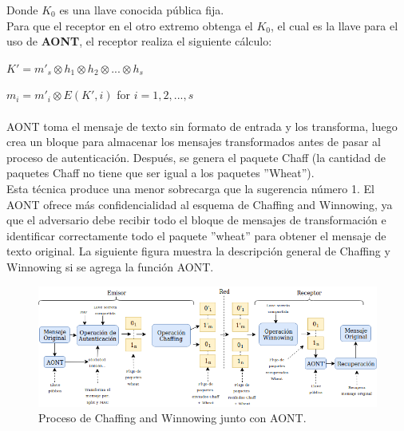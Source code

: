 \documentclass[12pt, a4paper, titlepage]{article}
\begin{document}
        Donde $K_0$ es una llave conocida pública fija.\\
        Para que el receptor en el otro extremo obtenga el $K_0$, el cual es la llave para el uso de \textbf{AONT}, el receptor realiza el siguiente cálculo:
        
        \begin{center}
            $K'=m'_s \otimes h_1 \otimes h_2 \otimes ... \otimes h_s$
        \end{center}
        \begin{center}
            $m_i=m'_i \otimes E(K',i)$ for $i=1,2,...,s$
        \end{center}
        
        \paragraph{}
        AONT toma el mensaje de texto sin formato de entrada y los transforma, luego crea un bloque para almacenar los mensajes transformados antes de pasar al proceso de autenticación. Después, se genera el paquete Chaff (la cantidad de paquetes Chaff no tiene que ser igual a los paquetes ''Wheat'').\\
        Esta técnica produce una menor sobrecarga que la sugerencia número 1. El AONT ofrece más confidencialidad al esquema de Chaffing and Winnowing, ya que el adversario debe recibir todo el bloque de mensajes de transformación e identificar correctamente todo el paquete ''wheat'' para obtener el mensaje de texto original. La siguiente figura muestra la
        descripción general de Chaffing y Winnowing si se agrega la función AONT.
        
        \begin{figure}[!htb]
			\begin{center}	          \includegraphics[width=14cm]{./imagenes/chaffVsCrypto.png}
				\caption{Proceso de Chaffing and Winnowing junto con AONT.}
			\end{center}
		\end{figure}
        
\end{document}
